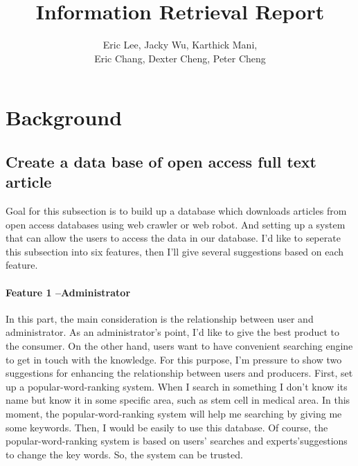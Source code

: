 \documentclass[a4paper]{article} %
\begin{document}
	
	\title{Information Retrieval Report}
	\author{Eric Lee, Jacky Wu, Karthick Mani, \\Eric Chang, Dexter Cheng, Peter Cheng} 
	
	\maketitle                     %
		
	\section*{Background}
	\label{background}
		
	\subsection*{Create a data base of open access full text article}
	\label{task1}
	
	Goal for this subsection is to build up a database which downloads articles from open access databases using web crawler or web robot. And setting up a system that can allow the users to access the data in our database. I'd like to seperate this subsection into six features, then I'll give several suggestions based on each feature. 
	
	\paragraph*{Feature 1 --Administrator}
	\label{task1:part1}
	
	In this part, the main consideration is the relationship between user and administrator. As an administrator's point, I'd like to give the best product to the consumer. On the other hand, users want to have convenient searching engine to get in touch with the knowledge. For this purpose, I'm pressure to show two suggestions for enhancing the relationship between users and producers. First, set up a popular-word-ranking system. When I search in something I don't know its name but know it in some specific area, such as stem cell in medical area. In this moment, the popular-word-ranking system will help me searching by giving me some keywords. Then, I would be easily to use this database. Of course, the popular-word-ranking system is based on users' searches and experts'suggestions to change the key words. So, the system can be trusted. 
	
\end{document}
